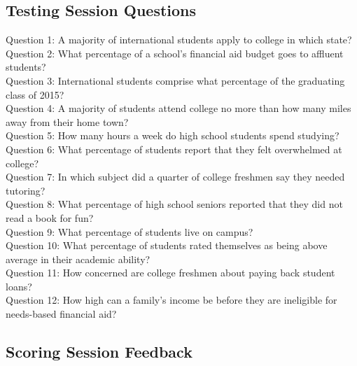 \documentclass{sig-alternate-05-2015}
\begin{document}
\subsection{Testing Session Questions}
\noindent Question 1: A majority of international students apply to college in which state?\\[\baselineskip]
\noindent Question 2: What percentage of a school's financial aid budget goes to affluent students?\\[\baselineskip]
\noindent Question 3: International students comprise what percentage of the graduating class of 2015?\\[\baselineskip]
\noindent Question 4: A majority of students attend college no more than how many miles away from their home town?\\[\baselineskip]
\noindent Question 5: How many hours a week do high school students spend studying?\\[\baselineskip]
\noindent Question 6: What percentage of students report that they felt overwhelmed at college?\\[\baselineskip]
\noindent Question 7: In which subject did a quarter of college freshmen say they needed tutoring?\\[\baselineskip]
\noindent Question 8: What percentage of high school seniors reported that they did not read a book for fun?\\[\baselineskip]
\noindent Question 9: What percentage of students live on campus?\\[\baselineskip]
\noindent Question 10: What percentage of students rated themselves as being above average in their academic ability?\\[\baselineskip]
\noindent Question 11: How concerned are college freshmen about paying back student loans?\\[\baselineskip]
\noindent Question 12: How high can a family's income be before they are ineligible for needs-based financial aid?\\[\baselineskip]

\subsection{Scoring Session Feedback}


\newpage
\end{document}
